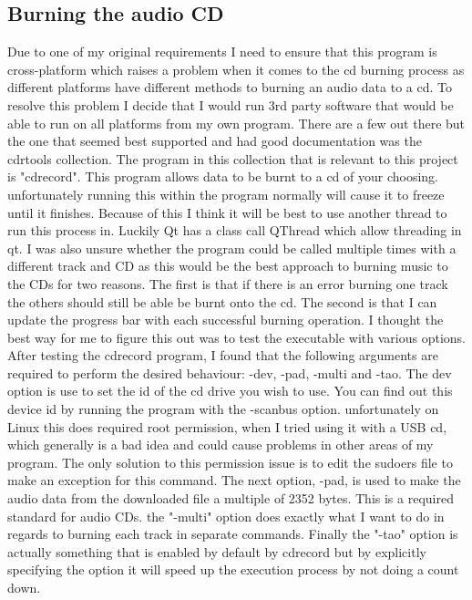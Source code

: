 \documentclass{article}
\begin{document}
\subsection{Burning the audio CD}
Due to one of my original requirements I need to ensure that this program is cross-platform
which raises a problem when it comes to the cd burning process as different platforms have
different methods to burning an audio data to a cd. To resolve this problem I decide that
I would run 3rd party software that would be able to run on all platforms from my own
program. There are a few out there but the one that seemed best supported and had good
documentation was the cdrtools collection. The program in this collection that is relevant
to this project is "cdrecord". This program allows data to be burnt to a cd of your choosing.
unfortunately running this within the program normally will cause it to freeze until it finishes.
Because of this I think it will be best to use another thread to run this process in. Luckily
Qt has a class call QThread which allow threading in qt.
I was also unsure whether the program could be called multiple times with a different track
and CD as this would be the best approach to burning music to the CDs for two reasons. The
first is that if there is an error burning one track the others should still be able be burnt
onto the cd. The second is that I can update the progress bar with each successful burning operation.
I thought the best way for me to figure this out was to test the executable with various options.
After testing the cdrecord program, I found that the following arguments are required to perform the
desired behaviour: -dev, -pad, -multi and -tao. The dev option is use to set the id of the
cd drive you wish to use. You can find out this device id by running the program with the -scanbus
option. unfortunately on Linux this does required root permission, when I tried using it with a
USB cd, which generally is a bad idea and could cause problems in other areas of my program. The
only solution to this permission issue is to edit the sudoers file to make an exception for this
command. The next option, -pad, is used to make the audio data from the downloaded file a multiple
of 2352 bytes. This is a required standard for audio CDs. the "-multi" option does exactly what
I want to do in regards to burning each track in separate commands. Finally the "-tao" option is
actually something that is enabled by default by cdrecord but by explicitly specifying the option
it will speed up the execution process by not doing a count down.
\end{document}
